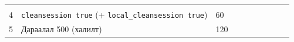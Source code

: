 \begin{longtable}[]{@{}llllllllll@{}}
\begin{minipage}[t]{0.07\columnwidth}
\strut
\end{minipage}\tabularnewline
\begin{minipage}[t]{0.07\columnwidth}\raggedright
4\strut
\end{minipage} & \begin{minipage}[t]{0.07\columnwidth}\raggedright
\texttt{cleansession\ true} (+ \texttt{local\_\allowbreak{}cleansession\ true})\strut
\end{minipage} & \begin{minipage}[t]{0.07\columnwidth}\raggedright
60\strut
\end{minipage} & \begin{minipage}[t]{0.07\columnwidth}\raggedright
\strut
\end{minipage} & \begin{minipage}[t]{0.07\columnwidth}\raggedright
\strut
\end{minipage} & \begin{minipage}[t]{0.07\columnwidth}\raggedright
\strut
\end{minipage} & \begin{minipage}[t]{0.07\columnwidth}\raggedright
\strut
\end{minipage} & \begin{minipage}[t]{0.07\columnwidth}\raggedright
\strut
\end{minipage} & \begin{minipage}[t]{0.07\columnwidth}\raggedright
\strut
\end{minipage} & \begin{minipage}[t]{0.07\columnwidth}\raggedright
\strut
\end{minipage}\tabularnewline
\begin{minipage}[t]{0.07\columnwidth}\raggedright
5\strut
\end{minipage} & \begin{minipage}[t]{0.07\columnwidth}\raggedright
Дараалал 500 (халилт)\strut
\end{minipage} & \begin{minipage}[t]{0.07\columnwidth}\raggedright
120\strut
\end{minipage} & \begin{minipage}[t]{0.07\columnwidth}\raggedright
\strut
\end{minipage} & \begin{minipage}[t]{0.07\columnwidth}\raggedright
\strut
\end{minipage} & \begin{minipage}[t]{0.07\columnwidth}\raggedright
\strut

\end{minipage}
\end{longtable}
